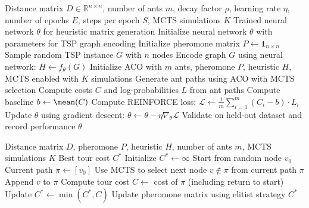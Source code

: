 \begin{algorithm}[H]
\caption{DeepACO with MCTS for TSP}
\label{alg:deepaco_mcts}
\begin{algorithmic}[1]
\Require Distance matrix $D \in \mathbb{R}^{n \times n}$, number of ants $m$, decay factor $\rho$, learning rate $\eta$, number of epochs $E$, steps per epoch $S$, MCTS simulations $K$
\Ensure Trained neural network $\theta$ for heuristic matrix generation
\State Initialize neural network $\theta$ with parameters for TSP graph encoding
\State Initialize pheromone matrix $P \leftarrow \mathbf{1}_{n \times n}$
        \State Sample random TSP instance $G$ with $n$ nodes
        \State Encode graph $G$ using neural network: $H \leftarrow f_\theta(G)$
        \State Initialize ACO with $m$ ants, pheromone $P$, heuristic $H$, MCTS enabled with $K$ simulations
        \State Generate ant paths using ACO with MCTS selection
        \State Compute costs $C$ and log-probabilities $L$ from ant paths
        \State Compute baseline $b \leftarrow \mean(C)$
        \State Compute REINFORCE loss: $\mathcal{L} \leftarrow \frac{1}{m} \sum_{i=1}^m (C_i - b) \cdot L_i$
        \State Update $\theta$ using gradient descent: $\theta \leftarrow \theta - \eta \nabla_\theta \mathcal{L}$
    \EndFor
    \State Validate on held-out dataset and record performance
\EndFor
\State \Return $\theta$
\end{algorithmic}
\end{algorithm}

\begin{algorithm}[H]
\caption{ACO Path Construction with MCTS}
\label{alg:aco_mcts_path}
\begin{algorithmic}[1]
\Require Distance matrix $D$, pheromone $P$, heuristic $H$, number of ants $m$, MCTS simulations $K$
\Ensure Best tour cost $C^*$
\State Initialize $C^* \leftarrow \infty$
    \State Start from random node $v_0$
    \State Current path $\pi \leftarrow [v_0]$
        \State Use MCTS to select next node $v \notin \pi$ from current path $\pi$
        \State Append $v$ to $\pi$
    \EndWhile
    \State Compute tour cost $C \leftarrow$ cost of $\pi$ (including return to start)
    \State Update $C^* \leftarrow \min(C^*, C)$
\EndFor
\State Update pheromone matrix using elitist strategy
\State \Return $C^*$
\end{algorithmic}
\end{algorithm}

